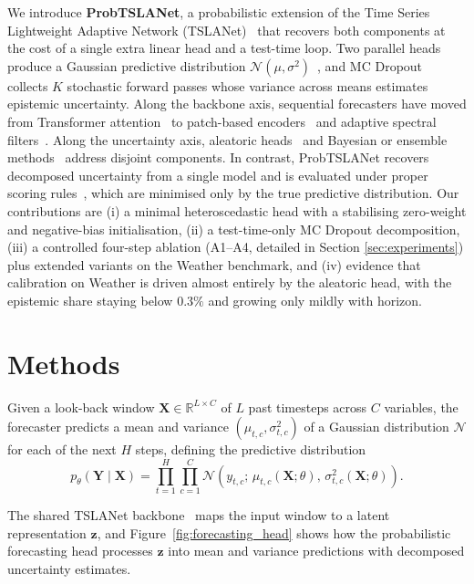 \documentclass{llncs}
\begin{document}
We introduce \textbf{ProbTSLANet}, a probabilistic extension of the Time Series Lightweight Adaptive Network (TSLANet)~\cite{eldele2024tslanet} that recovers both components at the cost of a single extra linear head and a test-time loop. Two parallel heads produce a Gaussian predictive distribution $\mathcal{N}(\mu,\sigma^{2})$~\cite{nix1994estimating}, and MC Dropout~\cite{gal2016dropout} collects $K$ stochastic forward passes whose variance across means estimates epistemic uncertainty. Along the backbone axis, sequential forecasters have moved from Transformer attention~\cite{zhou2021informer} to patch-based encoders~\cite{nie2023patchtst} and adaptive spectral filters~\cite{eldele2024tslanet}. Along the uncertainty axis, aleatoric heads~\cite{salinas2020deepar,nix1994estimating} and Bayesian or ensemble methods~\cite{gal2016dropout,lakshminarayanan2017simple} address disjoint components. In contrast, ProbTSLANet recovers decomposed uncertainty from a single model and is evaluated under proper scoring rules~\cite{gneiting2007strictly}, which are minimised only by the true predictive distribution. Our contributions are (i) a minimal heteroscedastic head with a stabilising zero-weight and negative-bias initialisation, (ii) a test-time-only MC Dropout decomposition, (iii) a controlled four-step ablation (A1–A4, detailed in Section \ref{sec:experiments}) plus extended variants on the Weather benchmark, and (iv) evidence that calibration on Weather is driven almost entirely by the aleatoric head, with the epistemic share staying below $0.3\%$ and growing only mildly with horizon.

\section{Methods}
\label{sec:methods}

Given a look-back window $\mathbf{X}\in\mathbb{R}^{L\times C}$ of $L$ past timesteps across $C$ variables, the forecaster predicts a mean and variance $(\mu_{t,c}, \sigma^2_{t,c})$ of a Gaussian distribution $\mathcal{N}$ for each of the next $H$ steps, defining the predictive distribution
\begin{equation}
    p_{\theta}(\mathbf{Y}\mid\mathbf{X})
    = \prod_{t=1}^{H}\prod_{c=1}^{C}
    \mathcal{N}\!\left(y_{t,c};\,\mu_{t,c}(\mathbf{X};\theta),\,\sigma_{t,c}^{2}(\mathbf{X};\theta)\right).
    \label{eq:predictive}
\end{equation}

The shared TSLANet backbone~\cite{eldele2024tslanet} maps the input window to a latent representation $\mathbf{z}$, and Figure~\ref{fig:forecasting_head} shows how the probabilistic forecasting head processes $\mathbf{z}$ into mean and variance predictions with decomposed uncertainty estimates.
\end{document}
